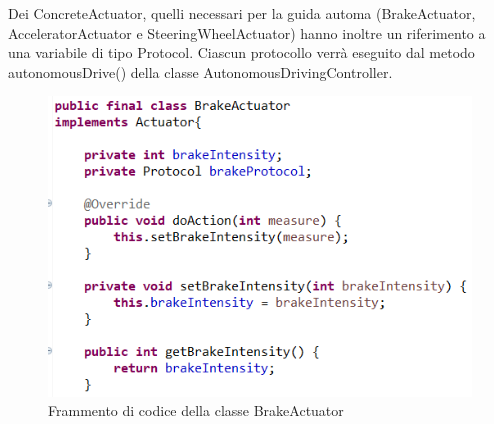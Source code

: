 \documentclass{article}
\begin{document}
\begin{itemize}
Dei ConcreteActuator, quelli necessari per la guida automa (BrakeActuator, AcceleratorActuator e SteeringWheelActuator) hanno inoltre un riferimento a una variabile di tipo Protocol. Ciascun protocollo verrà eseguito dal metodo autonomousDrive() della classe AutonomousDrivingController. 
\begin{figure} [H]
\begin{center}
\includegraphics[scale=0.8]{BrakeActuator.png}
\end{center}
\caption{Frammento di codice della classe BrakeActuator}
\end{figure}


\end{itemize}
\end{document}
